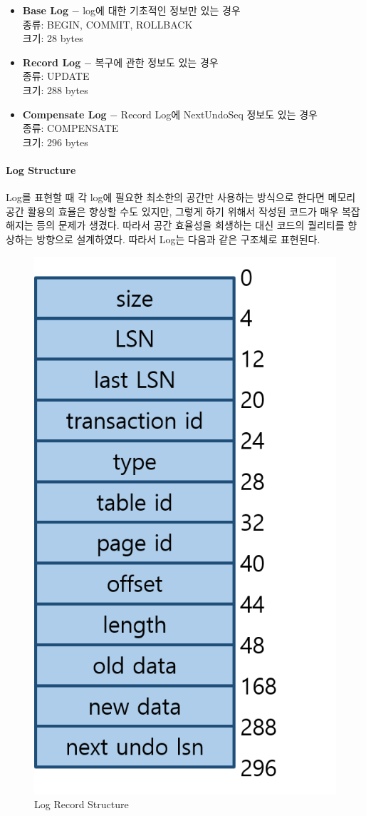 \documentclass[main.tex]{subfiles}
\begin{document}
\begin{itemize}
	\item \textbf{Base Log} $-$ log에 대한 기초적인 정보만 있는 경우\\
	종류: BEGIN, COMMIT, ROLLBACK\\
	크기: 28 bytes
	
	\item \textbf{Record Log} $-$ 복구에 관한 정보도 있는 경우\\
	종류: UPDATE\\
	크기: 288 bytes
	
	\item \textbf{Compensate Log} $-$ Record Log에 NextUndoSeq 정보도 있는 경우\\
	종류: COMPENSATE\\
	크기: 296 bytes
\end{itemize}

\paragraph{Log Structure}
Log를 표현할 때 각 log에 필요한 최소한의 공간만 사용하는 방식으로 한다면 메모리 공간 활용의 효율은 향상할 수도 있지만,
그렇게 하기 위해서 작성된 코드가 매우 복잡해지는 등의 문제가 생겼다. 따라서 공간 효율성을 희생하는 대신 코드의 퀄리티를 향상하는 방향으로 설계하였다.
따라서 Log는 다음과 같은 구조체로 표현된다.

\begin{figure}[!hbt]
	\centering
	\hspace{70px}\includegraphics[width=.4\textwidth]{images/recovery/log_structure.png}
	\caption{Log Record Structure}
\end{figure}
\end{document}
